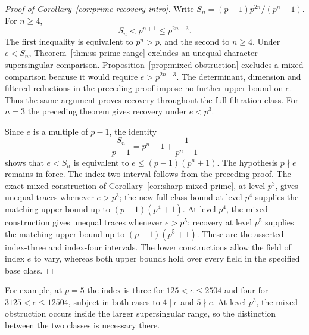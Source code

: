\begin{proof}[Proof of Corollary~\ref{cor:prime-recovery-intro}]
Write $S_n=(p-1)p^{2n}/(p^n-1)$. For $n\ge4$,
\[
 S_n<p^{n+1}\le p^{2n-3}.
\]
The first inequality is equivalent to $p^n>p$, and the second to $n\ge4$. Under $e<S_n$, Theorem~\ref{thm:ss-prime-range} excludes an unequal-character supersingular comparison. Proposition~\ref{prop:mixed-obstruction} excludes a mixed comparison because it would require $e>p^{2n-3}$. The determinant, dimension and filtered reductions in the preceding proof impose no further upper bound on $e$. Thus the same argument proves recovery throughout the full filtration class. For $n=3$ the preceding theorem gives recovery under $e<p^3$.

Since $e$ is a multiple of $p-1$, the identity
\[
 \frac{S_n}{p-1}=p^n+1+\frac{1}{p^n-1}
\]
shows that $e<S_n$ is equivalent to $e\le(p-1)(p^n+1)$. The hypothesis $p\nmid e$ remains in force. The index-two interval follows from the preceding proof. The exact mixed construction of Corollary~\ref{cor:sharp-mixed-prime}, at level $p^3$, gives unequal traces whenever $e>p^3$; the new full-class bound at level $p^4$ supplies the matching upper bound up to $(p-1)(p^4+1)$. At level $p^4$, the mixed construction gives unequal traces whenever $e>p^5$; recovery at level $p^5$ supplies the matching upper bound up to $(p-1)(p^5+1)$. These are the asserted index-three and index-four intervals. The lower constructions allow the field of index $e$ to vary, whereas both upper bounds hold over every field in the specified base class.
\end{proof}

For example, at $p=5$ the index is three for $125<e\le2504$ and four for $3125<e\le12504$, subject in both cases to $4\mid e$ and $5\nmid e$. At level $p^3$, the mixed obstruction occurs inside the larger supersingular range, so the distinction between the two classes is necessary there.
